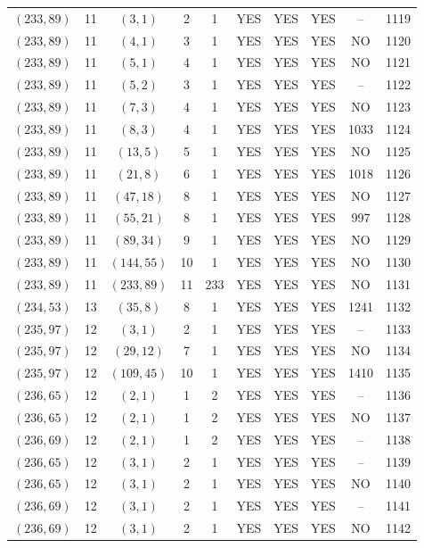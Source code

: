 \begin{longtable}{|c|c|c|c|c|c|c|c|c|c|}
$(233, 89)$ & 11 & $(3, 1)$ & 2 & 1 & YES & YES & YES & -- & 1119\\
$(233, 89)$ & 11 & $(4, 1)$ & 3 & 1 & YES & YES & YES & NO & 1120\\
$(233, 89)$ & 11 & $(5, 1)$ & 4 & 1 & YES & YES & YES & NO & 1121\\
$(233, 89)$ & 11 & $(5, 2)$ & 3 & 1 & YES & YES & YES & -- & 1122\\
$(233, 89)$ & 11 & $(7, 3)$ & 4 & 1 & YES & YES & YES & NO & 1123\\
$(233, 89)$ & 11 & $(8, 3)$ & 4 & 1 & YES & YES & YES & 1033 & 1124\\
$(233, 89)$ & 11 & $(13, 5)$ & 5 & 1 & YES & YES & YES & NO & 1125\\
$(233, 89)$ & 11 & $(21, 8)$ & 6 & 1 & YES & YES & YES & 1018 & 1126\\
$(233, 89)$ & 11 & $(47, 18)$ & 8 & 1 & YES & YES & YES & NO & 1127\\
$(233, 89)$ & 11 & $(55, 21)$ & 8 & 1 & YES & YES & YES & 997 & 1128\\
$(233, 89)$ & 11 & $(89, 34)$ & 9 & 1 & YES & YES & YES & NO & 1129\\
$(233, 89)$ & 11 & $(144, 55)$ & 10 & 1 & YES & YES & YES & NO & 1130\\
$(233, 89)$ & 11 & $(233, 89)$ & 11 & 233 & YES & YES & YES & NO & 1131\\
$(234, 53)$ & 13 & $(35, 8)$ & 8 & 1 & YES & YES & YES & 1241 & 1132\\
$(235, 97)$ & 12 & $(3, 1)$ & 2 & 1 & YES & YES & YES & -- & 1133\\
$(235, 97)$ & 12 & $(29, 12)$ & 7 & 1 & YES & YES & YES & NO & 1134\\
$(235, 97)$ & 12 & $(109, 45)$ & 10 & 1 & YES & YES & YES & 1410 & 1135\\
$(236, 65)$ & 12 & $(2, 1)$ & 1 & 2 & YES & YES & YES & -- & 1136\\
$(236, 65)$ & 12 & $(2, 1)$ & 1 & 2 & YES & YES & YES & NO & 1137\\
$(236, 69)$ & 12 & $(2, 1)$ & 1 & 2 & YES & YES & YES & -- & 1138\\
$(236, 65)$ & 12 & $(3, 1)$ & 2 & 1 & YES & YES & YES & -- & 1139\\
$(236, 65)$ & 12 & $(3, 1)$ & 2 & 1 & YES & YES & YES & NO & 1140\\
$(236, 69)$ & 12 & $(3, 1)$ & 2 & 1 & YES & YES & YES & -- & 1141\\
$(236, 69)$ & 12 & $(3, 1)$ & 2 & 1 & YES & YES & YES & NO & 1142\\

\end{longtable}
